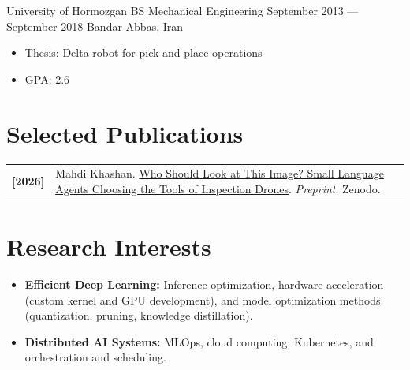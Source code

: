 \documentclass[letterpaper]{resume_config}
\begin{document}
\EducationExperience
    {University of Hormozgan} %
    {BS Mechanical Engineering} %
    {September 2013 --- September 2018} %
    {Bandar Abbas, Iran} %
\begin{itemize}[noitemsep, topsep=0pt, leftmargin=1em]
    \item Thesis: Delta robot for pick-and-place operations
    \item GPA: 2.6
\end{itemize}

\vspace{-6pt}

\section{Selected Publications}

\begin{tabular}{@{}p{0.6in} p{\dimexpr\textwidth-0.6in\relax}}
    \textbf{[2026]} & Mahdi Khashan. \href{https://zenodo.org/records/24212600}{Who Should Look at This Image? Small Language Agents Choosing the Tools of Inspection Drones}. \textit{Preprint}. Zenodo.
\end{tabular}

\vspace{-6pt}

\section{Research Interests}

\begin{itemize}[noitemsep, topsep=0pt, leftmargin=1em]
    \item \textbf{Efficient Deep Learning:} Inference optimization, hardware acceleration (custom kernel and GPU development), and model optimization methods (quantization, pruning, knowledge distillation).
    \item \textbf{Distributed AI Systems:} MLOps, cloud computing, Kubernetes, and orchestration and scheduling.
\end{itemize}
\end{document}
